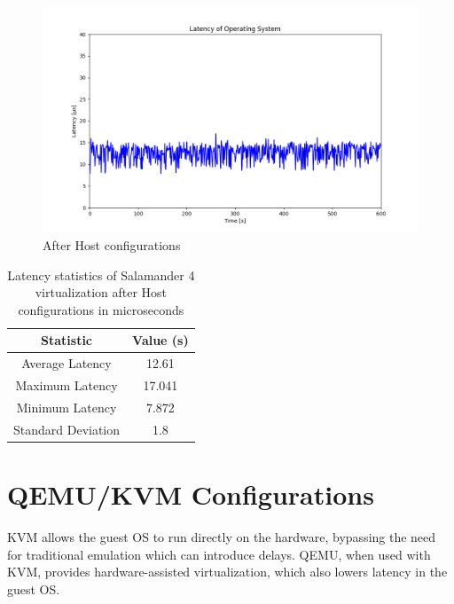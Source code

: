 \documentclass[MMR,Master,english]{twbook}
\begin{document}
\begin{figure}[H]
	\centering
	\includegraphics[width=1.0\columnwidth]{masterthesis-documentation/docs/sigmatek/xenomai/5rt_kernelparam_host/max_latency_rt_kernelparam_host/max_latency_rt_kernelparam_host.png}
	\caption[After Host configurations]{After Host configurations}
	\label{fig:max_latency_rt_kernelparam_host}
\end{figure}

\begin{table}[H]
	\centering
	\caption[Latency statistics of Salamander 4 after Host configurations]{Latency statistics of Salamander 4 virtualization after Host configurations in microseconds}
	\label{tab:latency_statistics_host}
	\setlength{\tabcolsep}{0.5em} %
	{\renewcommand{\arraystretch}{1.2}%
		\begin{tabular}{|c|c|}\hline
			\textbf{Statistic} & \textbf{Value (\textmu s)} \\\hline
			Average Latency    & 12.61                      \\\hline
			Maximum Latency    & 17.041                     \\\hline
			Minimum Latency    & 7.872                      \\\hline
			Standard Deviation & 1.8                        \\\hline
		\end{tabular}}
\end{table}


\section{QEMU/KVM Configurations}\label{sec:guest_configurations}
KVM allows the guest OS to run directly on the hardware, bypassing the need for traditional emulation which can introduce delays. QEMU, when used with KVM, provides hardware-assisted virtualization, which also lowers latency in the guest OS.
\end{document}
